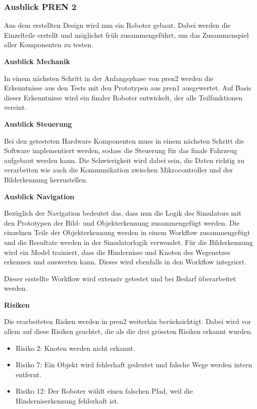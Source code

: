 \subsubsection{Ausblick PREN 2}

Aus dem erstellten Design wird nun ein Roboter gebaut. Dabei werden die Einzelteile erstellt und möglichst früh zusammengeführt, um das Zusammenspiel aller Komponenten zu testen.

\textbf{Ausblick Mechanik}

In einem nächsten Schritt in der Anfangsphase von \acrshort{pren2} werden die Erkenntnisse aus den Tests mit den Prototypen aus \acrshort{pren1} ausgewertet. Auf Basis dieser Erkenntnisse wird ein finaler Roboter entwickelt, der alle Teilfunktionen vereint.   

\textbf{Ausblick Steuerung}

Bei den getesteten Hardware Komponenten  muss in einem nächsten Schritt die Software implementiert werden, sodass die Steuerung für das finale Fahrzeug aufgebaut werden kann. Die Schwierigkeit wird dabei sein, die Daten richtig zu verarbeiten wie auch die Kommunikation zwischen Mikrocontroller und der Bilderkennung herzustellen.

\textbf{Ausblick Navigation}

Bezüglich der Navigation bedeutet das, dass nun die Logik des Simulators mit den Prototypen der Bild- und Objekterkennung zusammengefügt werden. Die einzelnen Teile der Objekterkennung werden in einem Workflow zusammengefügt und die Resultate werden in der Simulatorlogik verwendet. Für die Bilderkennung wird ein Model trainiert, dass die Hindernisse und Knoten des Wegenetzes erkennen und auswerten kann. Dieses wird ebenfalls in den Workflow integriert.

Dieser erstellte Workflow wird extensiv getestet und bei Bedarf überarbeitet werden.

\textbf{Risiken}

Die erarbeiteten Risken werden in \acrshort{pren2} weiterhin berücksichtigt. Dabei wird vor allem auf diese Risiken geachtet, die als die drei grössten Risiken erkannt wurden.

\begin{itemize}
    \item Risiko 2: Knoten werden nicht erkannt.
    \item Risiko 7: Ein Objekt wird fehlerhaft gedeutet und falsche Wege werden intern entfernt.
    \item Risiko 12: Der Roboter wählt einen falschen Pfad, weil die Hinderniserkennung fehlerhaft ist.
\end{itemize}

